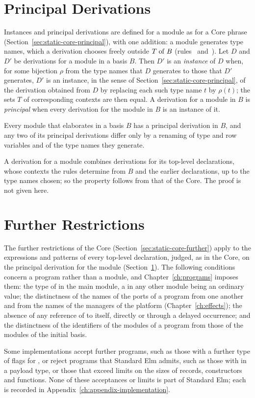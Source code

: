 \section{Principal Derivations}\label{sec:static-modules-principal}

Instances and principal derivations are defined for a module as for a Core
phrase (Section~\ref{sec:static-core-principal}), with one addition: a module
generates type names, which a derivation chooses freely outside $T \mathrel{\mathrm{of}} B$
(rules~ and~). Let $D$ and
$D'$ be derivations for a module in a basis $B$. Then $D'$ is an
\emph{instance} of $D$ when, for some bijection $\rho$ from the type names that
$D$ generates to those that $D'$ generates, $D'$ is an instance, in the sense of
Section~\ref{sec:static-core-principal}, of the derivation obtained from $D$ by
replacing each such type name $t$ by $\rho(t)$; the sets $T$ of corresponding
contexts are then equal. A derivation for a module in $B$ is
\emph{principal} when every derivation for the module in $B$ is an instance of
it. %

\begin{property}
Every module that elaborates in a basis $B$ has a principal derivation in $B$,
and any two of its principal derivations differ only by a renaming of type and
row variables and of the type names they generate.
\end{property}

A derivation for a module combines derivations for its top-level declarations,
whose contexts the rules determine from $B$ and the earlier declarations, up
to the type names chosen; so the property follows from that of the Core. The
proof is not given here. %

\section{Further Restrictions}\label{sec:static-modules-further}

The further restrictions of the Core (Section~\ref{sec:static-core-further})
apply to the expressions and patterns of every top-level declaration, judged,
as in the Core, on the principal derivation for the module
(Section~\ref{sec:static-modules-principal}). %
The following conditions concern a program rather than a module, and
Chapter~\ref{ch:programs} imposes them: the type of  in the main
module, a  in any other module being an ordinary value; %
the distinctness of the names of the ports of a program from one another and
from the names of the managers of the platform
(Chapter~\ref{ch:effects}); %
the absence of any reference of  to itself, directly or through a
delayed occurrence; and the distinctness of the identifiers of the modules of
a program from those of the modules of the initial basis. %

Some implementations accept further programs, such as those with a further
type of flags for , or reject programs that Standard Elm admits, such
as those with  in a payload type, or those that exceed limits on
the sizes of records, constructors and functions. None of these acceptances
or limits is part of Standard Elm; each is recorded in
Appendix~\ref{ch:appendix-implementation}. %
